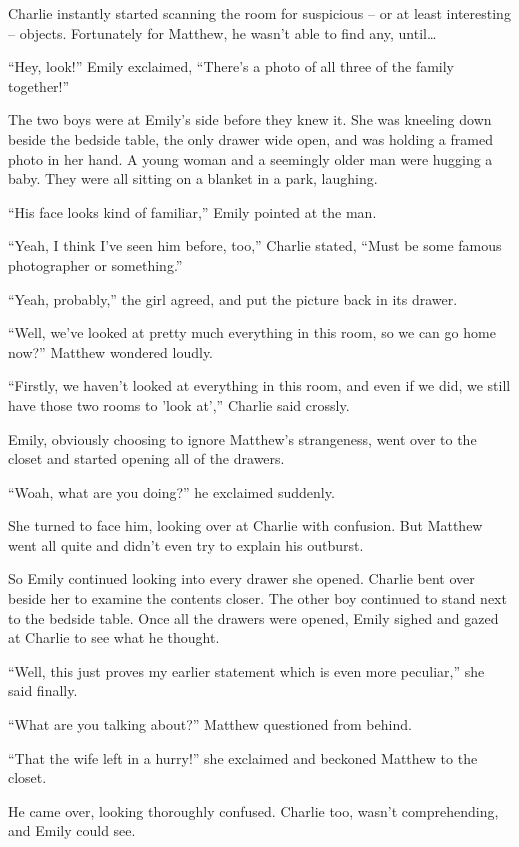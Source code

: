 Charlie instantly started scanning the room for suspicious – or at least interesting – objects. Fortunately for Matthew, he wasn't able to find any, until…

“Hey, look!” Emily exclaimed, “There's a photo of all three of the family together!”

The two boys were at Emily's side before they knew it. She was kneeling down beside the bedside table, the only drawer wide open, and was holding a framed photo in her hand. A young woman and a seemingly older man were hugging a baby. They were all sitting on a blanket in a park, laughing.

“His face looks kind of familiar,” Emily pointed at the man.

“Yeah, I think I've seen him before, too,” Charlie stated, “Must be some famous photographer or something.”

“Yeah, probably,” the girl agreed, and put the picture back in its drawer.

“Well, we've looked at pretty much everything in this room, so we can go home now?” Matthew wondered loudly.

“Firstly, we haven't looked at everything in this room, and even if we did, we still have those two rooms to 'look at',” Charlie said crossly.

Emily, obviously choosing to ignore Matthew's strangeness, went over to the closet and started opening all of the drawers.

“Woah, what are you doing?” he exclaimed suddenly.

She turned to face him, looking over at Charlie with confusion. But Matthew went all quite and didn't even try to explain his outburst.

So Emily continued looking into every drawer she opened. Charlie bent over beside her to examine the contents closer. The other boy continued to stand next to the bedside table. Once all the drawers were opened, Emily sighed and gazed at Charlie to see what he thought.

“Well, this just proves my earlier statement which is even more peculiar,” she said finally.

“What are you talking about?” Matthew questioned from behind.

“That the wife left in a hurry!” she exclaimed and beckoned Matthew to the closet.

He came over, looking thoroughly confused. Charlie too, wasn't comprehending, and Emily could see.

